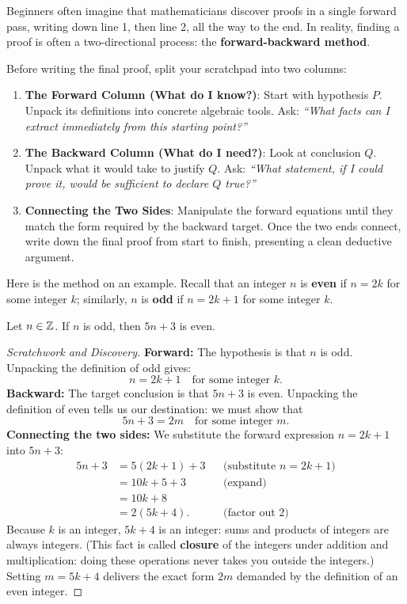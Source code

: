 Beginners often imagine that mathematicians discover proofs in a single forward pass, writing down line 1, then line 2, all the way to the end. In reality, finding a proof is often a two-directional process: the \textbf{forward-backward method}.

Before writing the final proof, split your scratchpad into two columns:
\begin{enumerate}
\item \textbf{The Forward Column (What do I know?)}: Start with hypothesis $P$. Unpack its definitions into concrete algebraic tools. Ask: \emph{``What facts can I extract immediately from this starting point?''}
\item \textbf{The Backward Column (What do I need?)}: Look at conclusion $Q$. Unpack what it would take to justify $Q$. Ask: \emph{``What statement, if I could prove it, would be sufficient to declare $Q$ true?''}
\item \textbf{Connecting the Two Sides}: Manipulate the forward equations until they match the form required by the backward target. Once the two ends connect, write down the final proof from start to finish, presenting a clean deductive argument.
\end{enumerate}

Here is the method on an example. Recall that an integer $n$ is \textbf{even} if $n = 2k$ for some integer $k$; similarly, $n$ is \textbf{odd} if $n = 2k + 1$ for some integer $k$.

\begin{theorem}
Let $n \in \mathbb{Z}$. If $n$ is odd, then $5n + 3$ is even.
\end{theorem}

\begin{proof}[Scratchwork and Discovery]
\textbf{Forward:} The hypothesis is that $n$ is odd. Unpacking the definition of odd gives:
\[
n = 2k + 1 \quad \text{for some integer } k.
\]
\textbf{Backward:} The target conclusion is that $5n + 3$ is even. Unpacking the definition of even tells us our destination: we must show that
\[
5n + 3 = 2m \quad \text{for some integer } m.
\]
\textbf{Connecting the two sides:} We substitute the forward expression $n = 2k + 1$ into $5n + 3$:
\begin{align*}
5n + 3 &= 5(2k + 1) + 3 && \text{(substitute } n = 2k + 1\text{)}\\
&= 10k + 5 + 3 && \text{(expand)}\\
&= 10k + 8\\
&= 2(5k + 4). && \text{(factor out } 2\text{)}
\end{align*}
Because $k$ is an integer, $5k + 4$ is an integer: sums and products of integers are always integers. (This fact is called \textbf{closure} of the integers under addition and multiplication: doing these operations never takes you outside the integers.) Setting $m = 5k + 4$ delivers the exact form $2m$ demanded by the definition of an even integer.
\end{proof}

